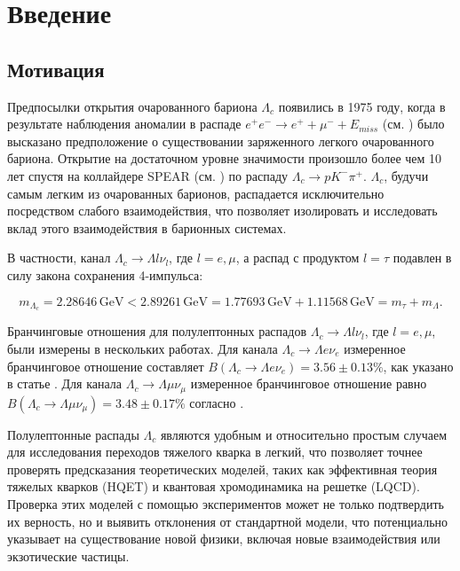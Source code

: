 \section{Введение}

\subsection{Мотивация}

Предпосылки открытия очарованного бариона $\Lambda_c$ появились в 1975 году, когда в результате наблюдения аномалии в распаде $e^+ e^- \to e^+ + \mu^- + E_{miss}$ (см. \cite{PhysRevLett1975}) было высказано предположение о существовании заряженного легкого очарованного бариона. Открытие на достаточном уровне значимости произошло более чем 10 лет спустя на коллайдере SPEAR (см. \cite{Avery1988}) по распаду $\Lambda_c \to p K^- \pi^+$. $\Lambda_c$, будучи самым легким из очарованных барионов, распадается исключительно посредством слабого взаимодействия, что позволяет изолировать и исследовать вклад этого взаимодействия в барионных системах.

В частности, канал $\Lambda_c \rightarrow \Lambda l \nu_l$, где $l = e, \mu$, а распад с продуктом $l = \tau$ подавлен в силу закона сохранения 4-импульса:

\begin{equation*}
    m_{\Lambda_c} = 2.28646\,\text{GeV} < 2.89261\,\text{GeV} = 1.77693\,\text{GeV} + 1.11568\,\text{GeV} = m_{\tau} + m_{\Lambda}.
\end{equation*}

Бранчинговые отношения для полулептонных распадов $\Lambda_c \rightarrow \Lambda l \nu_l$, где $l = e, \mu$, были измерены в нескольких работах. Для канала $\Lambda_c \rightarrow \Lambda e \nu_e$ измеренное бранчинговое отношение составляет $B(\Lambda_c \rightarrow \Lambda e \nu_e) = 3.56 \pm 0.13\%$, как указано в статье \cite{CLEO2022}. Для канала $\Lambda_c \rightarrow \Lambda \mu \nu_{\mu}$ измеренное бранчинговое отношение равно $B(\Lambda_c \rightarrow \Lambda \mu \nu_{\mu}) = 3.48 \pm 0.17\%$ согласно \cite{CLEO2023}.

Полулептонные распады $\Lambda_c$ являются удобным и относительно простым случаем для исследования переходов тяжелого кварка в легкий, что позволяет точнее проверять предсказания теоретических моделей, таких как эффективная теория тяжелых кварков (HQET) и квантовая хромодинамика на решетке (LQCD). Проверка этих моделей с помощью экспериментов может не только подтвердить их верность, но и выявить отклонения от стандартной модели, что потенциально указывает на существование новой физики, включая новые взаимодействия или экзотические частицы.

